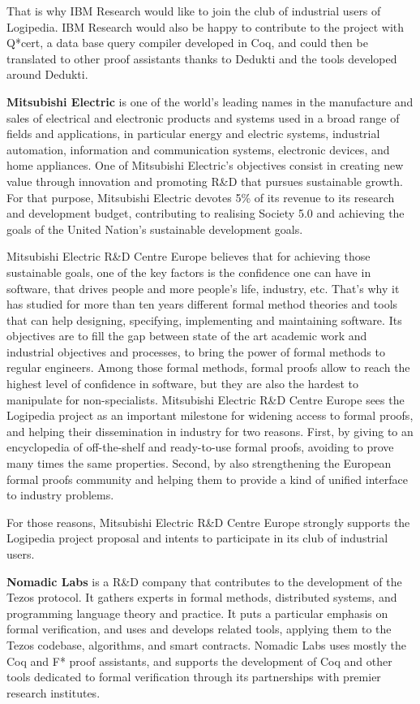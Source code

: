 {That is why IBM Research would like to join the club of industrial
users of Logipedia. IBM Research would also be happy to contribute to
the project with Q*cert, a data base query compiler developed in Coq,
and could then be translated to other proof assistants thanks to
Dedukti and the tools developed around Dedukti.

{\bf Mitsubishi Electric} is one of the world's leading names in the
manufacture and sales of electrical and electronic products and
systems used in a broad range of fields and applications, in
particular energy and electric systems, industrial automation,
information and communication systems, electronic devices, and home
appliances. One of Mitsubishi Electric's objectives consist in
creating new value through innovation and promoting R\&D that pursues
sustainable growth. For that purpose, Mitsubishi Electric devotes 5\%
of its revenue to its research and development budget, contributing to
realising Society 5.0 and achieving the goals of the United Nation's
sustainable development goals.

Mitsubishi Electric R\&D Centre Europe believes that for achieving
those sustainable goals, one of the key factors is the confidence one
can have in software, that drives people and more people's life,
industry, etc. That's why it has studied for more than ten years
different formal method theories and tools that can help designing,
specifying, implementing and maintaining software. Its objectives are
to fill the gap between state of the art academic work and industrial
objectives and processes, to bring the power of formal methods to
regular engineers. Among those formal methods, formal proofs allow to
reach the highest level of confidence in software, but they are also
the hardest to manipulate for non-specialists. Mitsubishi Electric
R\&D Centre Europe sees the Logipedia project as an important
milestone for widening access to formal proofs, and helping their
dissemination in industry for two reasons. First, by giving to an
encyclopedia of off-the-shelf and ready-to-use formal proofs, avoiding
to prove many times the same properties. Second, by also strengthening
the European formal proofs community and helping them to provide a
kind of unified interface to industry problems.

For those reasons, Mitsubishi Electric R\&D Centre Europe strongly
supports the Logipedia project proposal and intents to participate in
its club of industrial users.

{\bf Nomadic Labs} is a R\&D company that contributes to the
development of the Tezos protocol. It gathers experts in formal
methods, distributed systems, and programming language theory and
practice. It puts a particular emphasis on formal verification, and
uses and develops related tools, applying them to the Tezos codebase,
algorithms, and smart contracts. Nomadic Labs uses mostly the Coq and
F* proof assistants, and supports the development of Coq and other
tools dedicated to formal verification through its partnerships with
premier research institutes.

}
